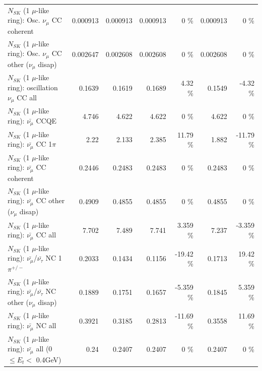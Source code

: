 \begin{table}
\begin{tabular}{| l | r | r | r  r | r  r |}
                        $N_{SK}$ (1 $\mu$-like ring): Osc. $\nu_\mu$ CC coherent &        0.000913 &        0.000913 &        0.000913 &        0 \%  &        0.000913 &        0 \%  \\ 
         $N_{SK}$ (1 $\mu$-like ring): Osc. $\nu_\mu$ CC other ($\nu_\mu$ disap) &        0.002647 &        0.002608 &        0.002608 &        0 \%  &        0.002608 &        0 \%  \\ 
                      $N_{SK}$ (1 $\mu$-like ring): oscillation $\nu_\mu$ CC all &          0.1639 &          0.1619 &          0.1689 &     4.32 \%  &          0.1549 &    -4.32 \%  \\ 
\hline
\hline
                              $N_{SK}$ (1 $\mu$-like ring): $\bar{\nu_\mu}$ CCQE &           4.746 &           4.622 &           4.622 &        0 \%  &           4.622 &        0 \%  \\ 
                         $N_{SK}$ (1 $\mu$-like ring): $\bar{\nu_\mu}$ CC 1$\pi$ &            2.22 &           2.133 &           2.385 &    11.79 \%  &           1.882 &   -11.79 \%  \\ 
                       $N_{SK}$ (1 $\mu$-like ring): $\bar{\nu_\mu}$ CC coherent &          0.2446 &          0.2483 &          0.2483 &        0 \%  &          0.2483 &        0 \%  \\ 
        $N_{SK}$ (1 $\mu$-like ring): $\bar{\nu_\mu}$ CC other ($\nu_\mu$ disap) &          0.4909 &          0.4855 &          0.4855 &        0 \%  &          0.4855 &        0 \%  \\ 
                          $N_{SK}$ (1 $\mu$-like ring): $\bar{\nu_{\mu}}$ CC all &           7.702 &           7.489 &           7.741 &    3.359 \%  &           7.237 &   -3.359 \%  \\ 
\hline
  $N_{SK}$ (1 $\mu$-like ring): $\bar{\nu_\mu}$/$\bar{\nu_\tau}$ NC 1$\pi^{+/-}$ &          0.2033 &          0.1434 &          0.1156 &   -19.42 \%  &          0.1713 &    19.42 \%  \\ 
$N_{SK}$ (1 $\mu$-like ring): $\bar{\nu_\mu}$/$\bar{\nu_\tau}$ NC other ($\nu_\mu$ disap) &          0.1889 &          0.1751 &          0.1657 &   -5.359 \%  &          0.1845 &    5.359 \%  \\ 
                          $N_{SK}$ (1 $\mu$-like ring): $\bar{\nu_{\mu}}$ NC all &          0.3921 &          0.3185 &          0.2813 &   -11.69 \%  &          0.3558 &    11.69 \%  \\ 
\hline
   $N_{SK}$ (1 $\mu$-like ring): $\bar{\nu_{\mu}}$ all (0 $\leq E_{t} <$ 0.4GeV) &            0.24 &          0.2407 &          0.2407 &        0 \%  &          0.2407 &        0 \%  \\ 

\end{tabular}
\end{table}
